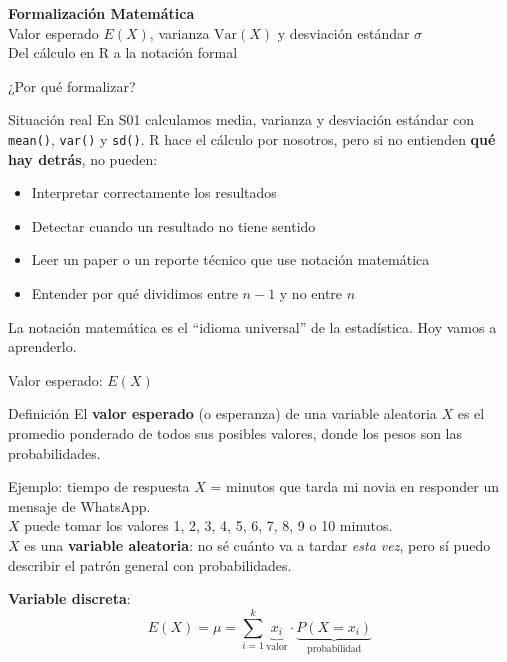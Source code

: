\documentclass[aspectratio=169, 11pt]{beamer}
\begin{document}
\begin{frame}{}
\vfill
\centering
{\Large\textbf{Formalizaci\'on Matem\'atica}}\\[1em]
{\normalsize Valor esperado $E(X)$, varianza $\text{Var}(X)$ y desviaci\'on est\'andar $\sigma$}\\[0.5em]
{\small Del c\'alculo en R a la notaci\'on formal}
\vfill
\end{frame}

\begin{frame}{¿Por qu\'e formalizar?}
\begin{exampleblock}{Situación real}
En S01 calculamos media, varianza y desviaci\'on est\'andar con \texttt{mean()}, \texttt{var()} y \texttt{sd()}.
R hace el c\'alculo por nosotros, pero si no entienden \textbf{qu\'e hay detr\'as}, no pueden:
\end{exampleblock}

\begin{itemize}
\item Interpretar correctamente los resultados
\item Detectar cuando un resultado no tiene sentido
\item Leer un paper o un reporte t\'ecnico que use notaci\'on matem\'atica
\item Entender por qu\'e dividimos entre $n-1$ y no entre $n$
\end{itemize}

\vspace{0.5em}
\alert{La notaci\'on matem\'atica es el ``idioma universal'' de la estad\'istica. Hoy vamos a aprenderlo.}
\end{frame}

\begin{frame}{Valor esperado: $E(X)$}
\begin{block}{Definición}
El \textbf{valor esperado} (o esperanza) de una variable aleatoria $X$ es el promedio ponderado de todos sus posibles valores, donde los pesos son las probabilidades.
\end{block}

\begin{exampleblock}{Ejemplo: tiempo de respuesta}
$X$ = minutos que tarda mi novia en responder un mensaje de WhatsApp.\\
$X$ puede tomar los valores 1, 2, 3, 4, 5, 6, 7, 8, 9 o 10 minutos.\\
$X$ es una \textbf{variable aleatoria}: no s\'e cu\'anto va a tardar \textit{esta vez}, pero s\'i puedo describir el patr\'on general con probabilidades.
\end{exampleblock}

\textbf{Variable discreta}:
\[
E(X) = \mu = \sum_{i=1}^{k} \underbrace{x_i}_{\text{valor}} \cdot \underbrace{P(X = x_i)}_{\text{probabilidad}}
\]
\end{frame}
\end{document}
